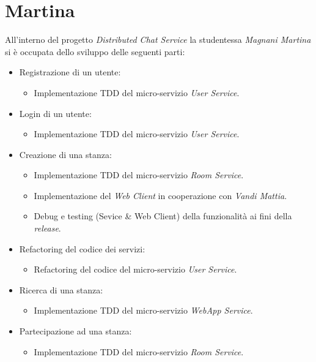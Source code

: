 \section{Martina}

All'interno del progetto \textit{Distributed Chat Service} la studentessa \textit{Magnani Martina} si è occupata dello sviluppo delle seguenti parti:

\begin{itemize}
    \item Registrazione di un utente:
    \begin{itemize}
        \item Implementazione TDD del micro-servizio \textit{User Service}.
    \end{itemize}
    \item Login di un utente:
    \begin{itemize}
        \item Implementazione TDD del micro-servizio \textit{User Service}.
    \end{itemize}
    \item Creazione di una stanza:
    \begin{itemize}
        \item Implementazione TDD del micro-servizio \textit{Room Service}.
        \item Implementazione del \textit{Web Client} in cooperazione con \textit{Vandi Mattia}.
        \item Debug e testing (Sevice \& Web Client) della funzionalità ai fini della \textit{release}.
    \end{itemize}
    \item Refactoring del codice dei servizi:
    \begin{itemize}
        \item Refactoring del codice del micro-servizio \textit{User Service}.
    \end{itemize}
    \item Ricerca di una stanza:
    \begin{itemize}
        \item Implementazione TDD del micro-servizio \textit{WebApp Service}.
    \end{itemize}
    \item Partecipazione ad una stanza:
    \begin{itemize}
        \item Implementazione TDD del micro-servizio \textit{Room Service}.
    \end{itemize}

\end{itemize}
